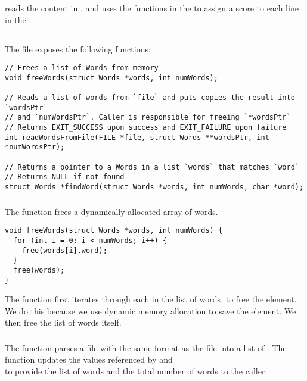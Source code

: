 \documentclass{article}
\theoremstyle{mytheoremstyle}
\theoremstyle{mytheoremstyle}
\theoremstyle{myproblemstyle}
\begin{document}
     reads the content in , and uses the functions in the  to assign a score to each line in the .

    \subsection{}

    The  file exposes the following functions:

\begin{lstlisting}
// Frees a list of Words from memory
void freeWords(struct Words *words, int numWords);

// Reads a list of words from `file` and puts copies the result into `wordsPtr`
// and `numWordsPtr`. Caller is responsible for freeing `*wordsPtr`
// Returns EXIT_SUCCESS upon success and EXIT_FAILURE upon failure
int readWordsFromFile(FILE *file, struct Words **wordsPtr, int *numWordsPtr);

// Returns a pointer to a Words in a list `words` that matches `word`
// Returns NULL if not found
struct Words *findWord(struct Words *words, int numWords, char *word);
\end{lstlisting}

    \subsubsection{}
    The  function frees a dynamically allocated array of words.

    \begin{lstlisting}
void freeWords(struct Words *words, int numWords) {
  for (int i = 0; i < numWords; i++) {
    free(words[i].word);
  }
  free(words);
}
    \end{lstlisting}

    The function first iterates through each  in the list of words, to free the  element. We do this because we use dynamic memory allocation to save the  element. We then free the list of words itself.

    \subsubsection{}

    The  function parses a file with the same format as the  file into a list of . The function updates the values referenced by  and \\ to provide the list of words and the total number of words to the caller.
\end{document}

